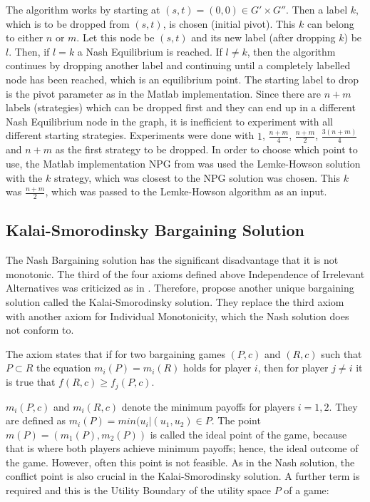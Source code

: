 The algorithm works by starting at $(s,t) = (0,0) \in G' \times G'' $. Then a label $k$, which is to be dropped from $(s,t)$, is chosen (initial pivot). This $k$ can belong to either $n$ or $m$. Let this node be $(s,t)$ and its new label (after dropping $k$) be $l$. Then, if $l=k$ a Nash Equilibrium is reached. If $l\neq k$, then the algorithm continues by dropping another label and continuing until a completely labelled node has been reached, which is an equilibrium point. The starting label to drop is the pivot parameter as in the Matlab implementation. Since there are $n+m$ labels (strategies) which can be dropped first and they can end up in a different Nash Equilibrium node in the graph, it is inefficient to experiment with all different starting strategies. Experiments were done with $1$, $\frac{n+m}{4}$, $\frac{n+m}{2}$, $\frac{3(n+m)}{4}$ and $n+m$ as the first strategy to be dropped. In order to choose which point to use, the Matlab implementation NPG from \citet{npg} was used the Lemke-Howson solution with the $k$ strategy, which was closest to the NPG solution was chosen. This $k$ was $\frac{n+m}{2}$, which was passed to the Lemke-Howson algorithm as an input.

\subsection{Kalai-Smorodinsky Bargaining Solution}
The Nash Bargaining solution has the significant disadvantage that it is not monotonic. The third of the four axioms defined above Independence of Irrelevant Alternatives was criticized as in \citet{kalai1975other}. Therefore, \citet{kalai1975other} propose another unique bargaining solution called the Kalai-Smorodinsky solution. They replace the third axiom with another axiom for Individual Monotonicity, which the Nash solution does not conform to. 

The axiom states that if for two bargaining games $(P,c)$ and $(R,c)$ such that $P \subset R$ the equation $m_i(P) = m_i(R)$ holds for player $i$, then for player $j \neq i$ it is true that $f(R,c) \geq f_j(P,c)$.

$m_i(P,c)$ and $m_i(R,c)$ denote the minimum payoffs for players $i = 1,2$. They are defined as $m_i(P) = min(u_i | (u_1,u_2) \in P$. The point $m(P) = (m_1(P),m_2(P))$ is called the ideal point of the game, because that is where both players achieve minimum payoffs; hence, the ideal outcome of the game. However, often this point is not feasible. As in the Nash solution, the conflict point is also crucial in the Kalai-Smorodinsky solution. A further term is required and this is the Utility Boundary of the utility space $P$ of a game:


